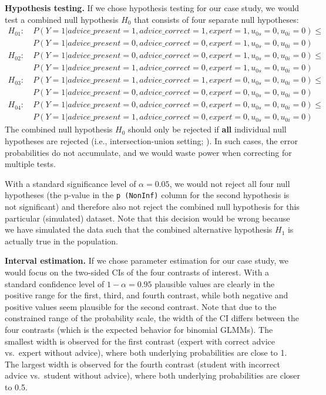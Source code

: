 \documentclass[
  man,
  floatsintext,
  longtable,
  a4paper,
  nolmodern,
  notxfonts,
  notimes,
  colorlinks=true,linkcolor=blue,citecolor=blue,urlcolor=blue]{apa7}
\begin{document}
\textbf{Hypothesis testing.} If we chose hypothesis testing for our case
study, we would test a combined null hypothesis \(H_0\) that consists of
four separate null hypotheses: \[
\begin{aligned}
H_{01}:\ & P(Y=1|advice\_present = 1, advice\_correct = 1, expert = 1, u_{0s} = 0, u_{0i} = 0) \leq \\
& P(Y=1|advice\_present = 0, advice\_correct = 0, expert = 1, u_{0s} = 0, u_{0i} = 0) \\
H_{02}:\ &P(Y=1|advice\_present = 0, advice\_correct = 0, expert = 1, u_{0s} = 0, u_{0i} = 0) \leq \\
& P(Y=1|advice\_present = 1, advice\_correct = 0, expert = 1, u_{0s} = 0, u_{0i} = 0) \\
H_{03}:\ &P(Y=1|advice\_present = 1, advice\_correct = 1, expert = 0, u_{0s} = 0, u_{0i} = 0) \leq \\
& P(Y=1|advice\_present = 0, advice\_correct = 0, expert = 0, u_{0s} = 0, u_{0i} = 0) \\
H_{04}:\ & P(Y=1|advice\_present = 0, advice\_correct = 0, expert = 0, u_{0s} = 0, u_{0i} = 0) \leq \\
& P(Y=1|advice\_present = 1, advice\_correct = 0, expert = 0, u_{0s} = 0, u_{0i} = 0)
\end{aligned}
\] The combined null hypothesis \(H_0\) should only be rejected if
\textbf{all} individual null hypotheses are rejected (i.e.,
intersection-union setting;
). In such cases, the error probabilities do not
accumulate, and we would waste power when correcting for multiple tests.

With a standard significance level of \(\alpha = 0.05\), we would not
reject all four null hypotheses (the p-value in the \texttt{p\ (NonInf)}
column for the second hypothesis is not significant) and therefore also
not reject the combined null hypothesis for this particular (simulated)
dataset. Note that this decision would be wrong because we have
simulated the data such that the combined alternative hypothesis \(H_1\)
is actually true in the population.

\textbf{Interval estimation.} If we chose parameter estimation for our
case study, we would focus on the two-sided CIs of the four contrasts of
interest. With a standard confidence level of \(1 - \alpha = 0.95\)
plausible values are clearly in the positive range for the first, third,
and fourth contrast, while both negative and positive values seem
plausible for the second contrast. Note that due to the constrained
range of the probability scale, the width of the CI differs between the
four contrasts (which is the expected behavior for binomial GLMMs). The
smallest width is observed for the first contrast (expert with correct
advice vs.~expert without advice), where both underlying probabilities
are close to 1. The largest width is observed for the fourth contrast
(student with incorrect advice vs.~student without advice), where both
underlying probabilities are closer to 0.5.
\end{document}
